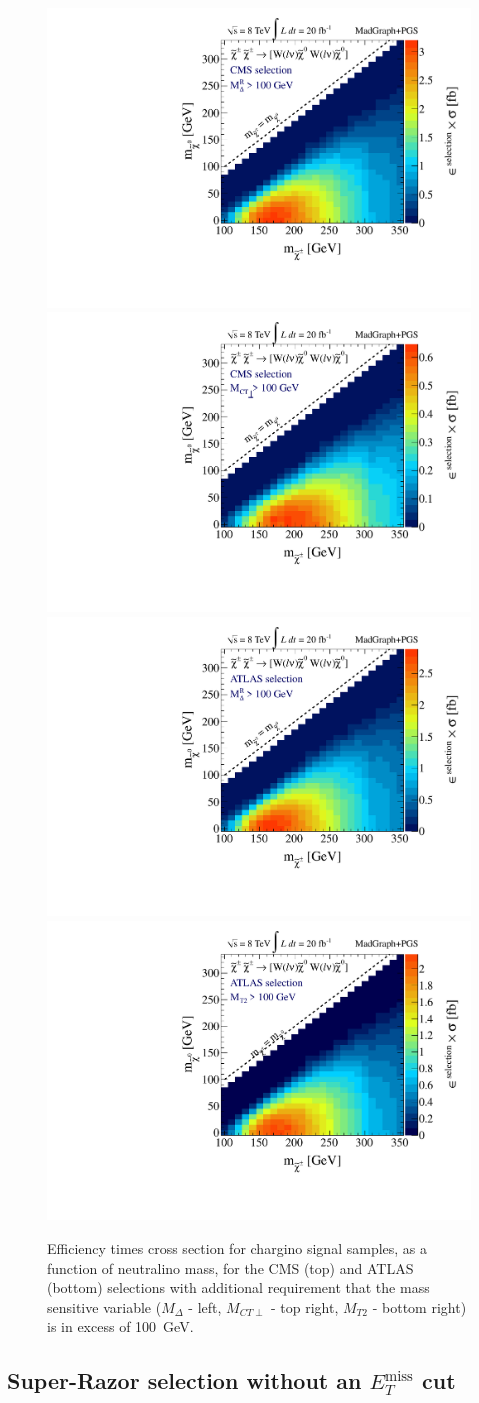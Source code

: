 \begin{figure}[ht]
\includegraphics[width=0.35\columnwidth]{fig/sectionIII/XSEC_chargino_CMS_Mdelta100.pdf}
\includegraphics[width=0.35\columnwidth]{fig/sectionIII/XSEC_chargino_CMS_MCTperp100.pdf}\\
\includegraphics[width=0.35\columnwidth]{fig/sectionIII/XSEC_chargino_ATLAS_Mdelta100.pdf}
\includegraphics[width=0.35\columnwidth]{fig/sectionIII/XSEC_chargino_ATLAS_MT2100.pdf}
\caption{Efficiency times cross section for chargino signal samples, as a function of neutralino mass, for the CMS (top) and ATLAS (bottom) selections with additional requirement that the mass sensitive variable ($M_{\Delta}$ - left, $M_{CT\perp}$ - top right, $M_{T2}$ - bottom right) is in excess of 100~GeV. \label{fig:XSEC_M100_chargino}}
\end{figure}

\subsection{Super-Razor selection without an $E_{T}^\text{miss}$ cut  }

